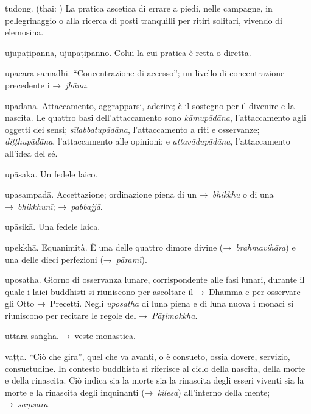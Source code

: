 \begin{glossarydescription}
\item[tudong.] (thai: ) La pratica ascetica di errare a piedi, nelle
  campagne, in pellegrinaggio o alla ricerca di posti tranquilli per ritiri
  solitari, vivendo di elemosina.


\item[ujupaṭipanna, ujupaṭipanno.] Colui la cui pratica è retta o diretta.

\item[upacāra samādhi.] ``Concentrazione di accesso''; un livello di
  concentrazione precedente i →~\emph{jhāna}.

\item[upādāna.]\label{glossary-upadana} Attaccamento, aggrapparsi, aderire; è il sostegno per il
  divenire e la nascita. Le quattro basi dell'attaccamento sono
  \emph{kāmupādāna}, l'attaccamento agli oggetti dei sensi;
  \emph{sīlabbatupādāna}, l'attaccamento a riti e osservanze;
  \emph{diṭṭhupādāna}, l'attaccamento alle opinioni; e \emph{attavādupādāna},
  l'attaccamento all'idea del sé.

\item[upāsaka.] Un fedele laico.

\item[upasampadā.] Accettazione; ordinazione piena di un →~\emph{bhikkhu}
  o di una →~\emph{bhikkhunī}; →~\emph{pabbajjā}.

\item[upāsikā.] Una fedele laica.

\item[upekkhā.] Equanimità. È una delle quattro dimore divine
  (→~\emph{brahmavihāra}) e una delle dieci perfezioni (→~\emph{pāramī}).

\item[uposatha.] Giorno di osservanza lunare, corrispondente alle fasi
  lunari, durante il quale i laici buddhisti si riuniscono per ascoltare il
  →~Dhamma e per osservare gli Otto →~Precetti. Negli \emph{uposatha} di luna
  piena e di luna nuova i monaci si riuniscono per recitare le regole del
  →~\emph{Pāṭimokkha}.

\item[uttarā-saṅgha.] →~veste monastica.


\item[vaṭṭa.] ``Ciò che gira'', quel che va avanti, o è consueto, ossia
  dovere, servizio, consuetudine. In contesto buddhista si riferisce al ciclo
  della nascita, della morte e della rinascita. Ciò indica sia la morte sia la
  rinascita degli esseri viventi sia la morte e la rinascita degli inquinanti
  (→~\emph{kilesa}) all'interno della mente; →~\emph{saṃsāra}.


\end{glossarydescription}
